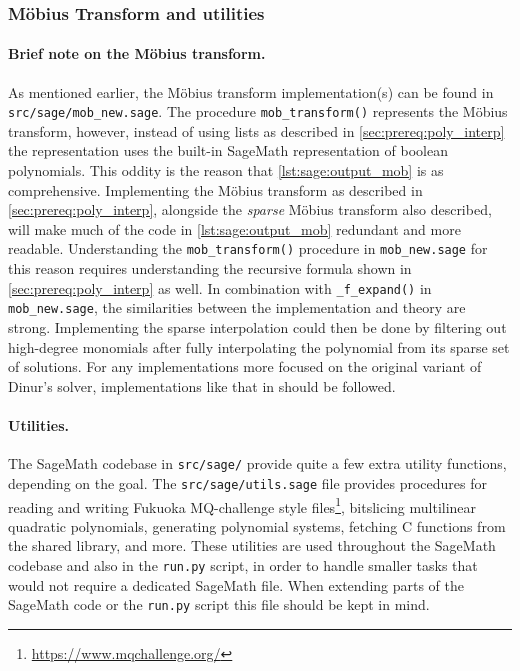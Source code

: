 \subsubsection{Möbius Transform and utilities}
\paragraph{Brief note on the Möbius transform.} As mentioned earlier, the Möbius transform implementation(s) can be found in \texttt{src/sage/mob\_new.sage}. The procedure \texttt{mob\_transform()} represents the Möbius transform, however, instead of using lists as described in \cref{sec:prereq:poly_interp} the representation uses the built-in SageMath representation of boolean polynomials. This oddity is the reason that \cref{lst:sage:output_mob} is as comprehensive. Implementing the Möbius transform as described in \cref{sec:prereq:poly_interp}, alongside the \textit{sparse} Möbius transform also described, will make much of the code in \cref{lst:sage:output_mob} redundant and more readable. Understanding the \texttt{mob\_transform()} procedure in \texttt{mob\_new.sage} for this reason requires understanding the recursive formula shown in \cref{sec:prereq:poly_interp} as well. In combination with \texttt{\_f\_expand()} in \texttt{mob\_new.sage}, the similarities between the implementation and theory are strong. Implementing the sparse interpolation could then be done by filtering out high-degree monomials after fully interpolating the polynomial from its sparse set of solutions. For any implementations more focused on the original variant of Dinur's solver, implementations like that in \cite{cryptoeprint:2022/1412} should be followed.

\paragraph{Utilities.} The SageMath codebase in \texttt{src/sage/} provide quite a few extra utility functions, depending on the goal. The \texttt{src/sage/utils.sage} file provides procedures for reading and writing Fukuoka MQ-challenge style files\footnote{\url{https://www.mqchallenge.org/}}, bitslicing multilinear quadratic polynomials, generating polynomial systems, fetching C functions from the shared library, and more. These utilities are used throughout the SageMath codebase and also in the \texttt{run.py} script, in order to handle smaller tasks that would not require a dedicated SageMath file. When extending parts of the SageMath code or the \texttt{run.py} script this file should be kept in mind.

